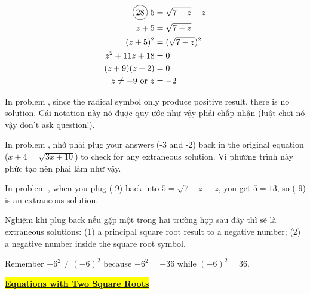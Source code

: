\begin{multicols}{2}
\begin{align*}
  \circled{28}\ 5&=\sqrt{7-z}-z\\
  z+5&=\sqrt{7-z}\\
  (z+5)^{2}&=(\sqrt{7-z})^{2}\\
  z^{2}+11z+18&=0\\
  (z+9)(z+2)&=0\\
  z\neq-9 \text{ or } z&=-2
\end{align*}
\end{multicols}

In problem , since the radical symbol only produce positive result, there is no solution. Cái notation này nó được quy ước như vậy phải chấp nhận (luật chơi nó vậy don't ask question!).

In problem , nhớ phải plug your answers (-3 and -2) back in the original equation ($x+4=\sqrt{3x+10}$) to check for any extraneous solution. Vì phương trình này phức tạo nên phải làm như vậy.

In problem , when you plug (-9) back into $5=\sqrt{7-z}-z$, you get $5=13$, so (-9) is an extraneous solution.

Nghiệm khi plug back nếu gặp một trong hai trường hợp sau đây thì sẽ là extraneous solutions: (1) a principal square root result to a negative number; (2) a negative number inside the square root symbol.

\vspace{.4cm}

Remember $-6^{2}\neq(-6)^{2}$ because $-6^{2}=-36$ while $(-6)^{2}=36$.

\newpage

\centerline{\colorbox{yellow}{\underline{\textbf{\large Equations with Two Square Roots}}}}

\vspace{.5cm}

